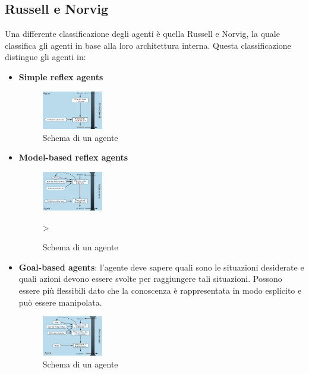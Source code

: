 \subsection{Russell e Norvig}
Una differente classificazione degli agenti è quella Russell e Norvig, la quale
classifica gli agenti in base alla loro architettura interna. Questa classificazione
distingue gli agenti in:
\begin{itemize}
    \item \textbf{Simple reflex agents}
          \begin{figure}[!ht]
              \centering
              \includegraphics[width=0.25\textwidth]{./img/Agenti/SimpleReflexAgents.png}
              \caption{Schema di un agente}
              \label{fig:simpleReflex}
          \end{figure}
    \item \textbf{Model-based reflex agents}
          \begin{figure}[!ht]
              \centering
              \includegraphics[width=0.25\textwidth]{./img/Agenti/ModelBasedReflexAgent.png}
              \caption{Schema di un agente}
              \label{fig:ModelReflex}>
          \end{figure}
    \item \textbf{Goal-based agents}: l'agente deve sapere quali sono le
          situazioni desiderate e quali azioni devono essere svolte per raggiungere
          tali situazioni. Possono essere più flessibili dato che la conoscenza
          è rappresentata in modo esplicito e può essere manipolata.
          \begin{figure}[!ht]
              \centering
              \includegraphics[width=0.25\textwidth]{./img/Agenti/GlobalBasedAgent.png}
              \caption{Schema di un agente}

\end{figure}
\end{itemize}
